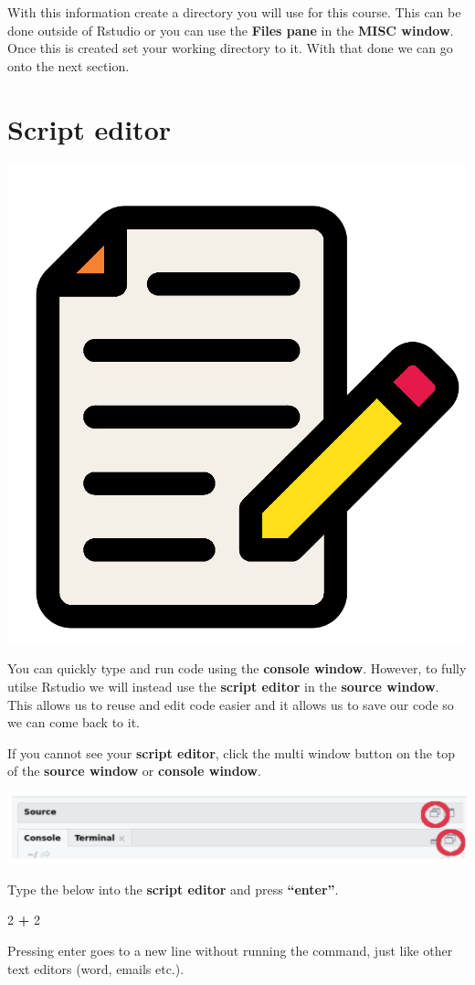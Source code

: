 \documentclass[]{book}
\newenvironment{Shaded}{\begin{snugshade}}{\end{snugshade}}
\newcommand{\DecValTok}[1]{\textcolor[rgb]{0.00,0.00,0.81}{#1}}
\newcommand{\StringTok}[1]{\textcolor[rgb]{0.31,0.60,0.02}{#1}}
\newcommand{\OperatorTok}[1]{\textcolor[rgb]{0.81,0.36,0.00}{\textbf{#1}}}
\begin{document}
With this information create a directory you will use for this course.
This can be done outside of Rstudio or you can use the \textbf{Files
pane} in the \textbf{MISC window}. Once this is created set your working
directory to it. With that done we can go onto the next section.

\section{Script editor}\label{script-editor}

\begin{center}\includegraphics[width=0.2\linewidth]{figures/editor} \end{center}

You can quickly type and run code using the \textbf{console window}.
However, to fully utilse Rstudio we will instead use the \textbf{script
editor} in the \textbf{source window}. This allows us to reuse and edit
code easier and it allows us to save our code so we can come back to it.

If you cannot see your \textbf{script editor}, click the multi window
button on the top of the \textbf{source window} or \textbf{console
window}.

\begin{center}\includegraphics[width=0.8\linewidth]{figures/script_editor_expand} \end{center}

Type the below into the \textbf{script editor} and press
\textbf{``enter''}.

\begin{Shaded}
\begin{Highlighting}[]
\DecValTok{2} \OperatorTok{+}\StringTok{ }\DecValTok{2}
\end{Highlighting}
\end{Shaded}

Pressing enter goes to a new line without running the command, just like
other text editors (word, emails etc.).
\end{document}
